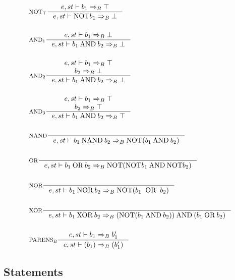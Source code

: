 \begin{align*}
&\inference[$\text{NOT}_\top$]{e,st \vdash b_1 \Rightarrow_B \top}
                       {e,st \vdash \Tnot b_1 \Rightarrow_B \bot}
\\\\
&\inference[$\text{AND}_1$]{e,st \vdash b_1 \Rightarrow_B \bot}
                    {e,st \vdash b_1 \Tand b_2 \Rightarrow_B \bot}
\\\\
&\inference[$\text{AND}_2$]{e,st \vdash b_1 \Rightarrow_B \top \\ b_2 \Rightarrow_B \bot}
								    {e,st \vdash b_1 \Tand b_2 \Rightarrow_B \bot}
\\\\
&\inference[$\text{AND}_3$]{e,st \vdash b_1 \Rightarrow_B \top \\ b_2 \Rightarrow_B \top}
								    {e,st \vdash b_1 \Tand b_2 \Rightarrow_B \top}
\\\\
&\inference[NAND]{}
								   {e,st \vdash b_1 \Tnand b_2 \Rightarrow_B \Tnot( b_1 \Tand b_2 )}
\\\\
&\inference[OR]{}
                 {e,st \vdash b_1 \Tor b_2 \Rightarrow_B \Tnot(\Tnot b_1 \Tand \Tnot b_2)}
\\\\
&\inference[NOR]{}
								   {e,st \vdash b_1 \Tnor b_2 \Rightarrow_B \Tnot( b_1 \;\; \textrm{OR} \;\; b_2 )}
\\\\
&\inference[XOR]{}
                  {e,st \vdash b_1 \Txor b_2 \Rightarrow_B (\Tnot(b_1 \Tand b_2)) \Tand (b_1 \Tor b_2)}
\\\\
&\inference[$\text{PARENS}_\text{B}$]{e,st \vdash b_1 \Rightarrow_B b_1'}
                       {e,st \vdash (b_1) \Rightarrow_B (b_1')}
\end{align*}

\subsection{Statements}
\newcommand{\Tlet}{\text{let}}
